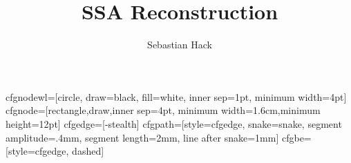 
\tikzstyle cfgnodewl=[circle, draw=black, fill=white, inner sep=1pt, minimum width=4pt]
\tikzstyle cfgnode=[rectangle,draw,inner sep=4pt, minimum width=1.6cm,minimum height=12pt]
\tikzstyle cfgedge=[-stealth]
\tikzstyle cfgpath=[style=cfgedge, snake=snake, segment amplitude=.4mm, segment length=2mm, line after snake=1mm]
\tikzstyle cfgbe=[style=cfgedge, dashed]

\newcommand{\exgraph}[4]{
	\draw (0,3.7)     node[cfgnode] (l1) { #1 };
	\draw (1.0,1.8)   node[cfgnode] (l2) { #2 };
	\draw (-1.0,1.8)  node[cfgnode] (l3) { #3 };
	\draw (0,-0.1)    node[cfgnode] (l4) { #4 };
	\draw[cfgedge] (l1) -- (l2);
	\draw[cfgedge] (l1) -- (l3);
	\draw[cfgedge] (l2) -- (l4);
	\draw[cfgedge] (l3) -- (l4);
}

\newcommand{\loopedgeR}[2]{([xshift=3mm] #1.south) |- ([shift={(3mm, -3mm)}] #1.south east) -- ([shift={(3mm, 3mm)}] #2.north east) -| ([xshift=3mm] #2.north)}
\newcommand{\loopedgeRM}[3]{([xshift=3mm] #1.south) |- ([shift={(3mm, -3mm)}] #1.south east) -- (#2) -- ([shift={(3mm, 3mm)}] #3.north east) -| ([xshift=3mm] #3.north)}
\newcommand{\loopedgeL}[2]{([xshift=-3mm] #1.south) |- ([shift={(-3mm, -3mm)}] #1.south west) -- ([shift={(-3mm, 3mm)}] #2.north west) -| ([xshift=-3mm] #2.north)}

\newcommand{\insnlist}[3]{
\begin{array}{rcl}
#1 & \gets  & #2 \\
   & \vdots & \\
#3 & \gets  & #1 \\
   & \gets  & #3 \\
\end{array}
}


\newcommand{\iuse}[1]{\gets\var #1}
\newcommand{\idef}[1]{\var #1\gets}
\newcommand{\var}[1]{\mathtt{#1}}
\newcommand{\phiop}{$\phi$-function}
\newcommand{\phiops}{\phiop s}
\newcommand{\dom}{\preceq}
\newcommand{\sdom}{\prec}
\newcommand{\phizero}{\ensuremath{\phi_0}}


\title{SSA Reconstruction}
\author{Sebastian Hack}

